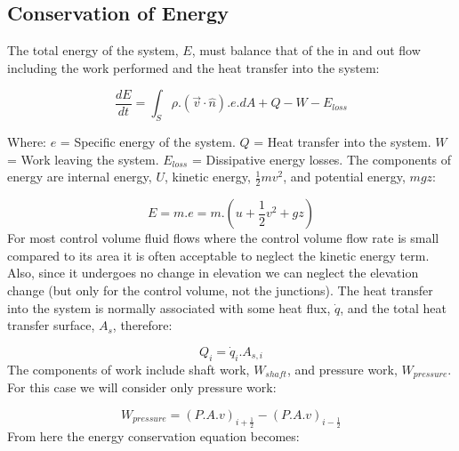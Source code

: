 \documentclass[11pt,letterpaper,titlepage]{article}
\newcommand{\half}{\frac{1}{2}}
\begin{document}
\newpage
\subsection{Conservation of Energy}
The total energy of the system, $E$, must balance that of the in and out flow including the work performed and the heat transfer into the system:

\begin{equation*}
\frac{dE}{dt}=\int_S \rho.(\vec{v}\cdot \hat{n}).e.dA + Q - W -E_{loss}
\end{equation*}

\noindent 
Where: 
\newline \noindent $e$ \quad = Specific energy of the system.
\newline \noindent $Q$ \quad = Heat transfer into the system.
\newline \noindent $W$ \quad = Work leaving the system.
\newline \noindent $E_{loss}$ \quad = Dissipative energy losses.
\newline
\newline
The components of energy are internal energy, $U$, kinetic energy, $\half mv^2$, and potential energy, $mgz$:

\begin{equation*}
E= m.e = m.(u+\half v^2+gz)
\end{equation*}
\newline
For most control volume fluid flows where the control volume flow rate is small compared to its area it is often acceptable to neglect the kinetic energy term. Also, since it undergoes no change in elevation we can neglect the elevation change (but only for the control volume, not the junctions).
\newline
\newline
The heat transfer into the system is normally associated with some heat flux, $\dot{q}$, and the total heat transfer surface, $A_s$, therefore:

\begin{equation*}
Q_i=\dot{q}_i.A_{s,i}
\end{equation*}
\newline
The components of work include shaft work, $W_{shaft}$, and pressure work, $W_{pressure}$. For this case we will consider only pressure work:

\begin{equation*}
W_{pressure}=(P.A.v)_{i+\half} - (P.A.v)_{i-\half} 
\end{equation*}
\newline
\noindent
From here the energy conservation equation becomes:
\end{document}

